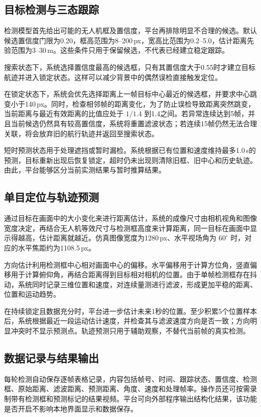 \subsection{目标检测与三态跟踪}

检测模型首先给出可能的无人机框及置信度，平台再排除明显不合理的候选。默认候选置信度门限为0.20，框高范围为8--200\,px，宽高比范围为0.2--5.0，估计距离先验范围为3--30\,m。这些条件只用于保留候选，不代表已经建立稳定跟踪。

搜索状态下，系统选择置信度最高的候选框，只有其置信度大于0.55时才建立目标航迹并进入锁定状态。这样可以减少背景中的偶然误检直接触发定位。

在锁定状态下，系统会优先选择距离上一帧目标中心最近的候选框，并要求中心跳变小于140\,px。同时，检查相邻帧的距离变化，为了防止误检导致距离突然跳变，当前距离与最近有效距离的比值应处于 $1/1.4$ 到1.4之间。若异常连续达到5帧，并且当前候选仍然具有较高置信度，系统将重置滤波状态；若连续15帧仍然无法合理关联，将会放弃旧的航行轨迹并返回至搜索状态。

短时预测状态用于处理遮挡或暂时漏检。系统根据已有位置和速度维持最多1.0\,s的预测，目标重新出现后恢复锁定，超时仍未出现则清除旧框、旧中心和历史轨迹。由此，平台能够区分当前实测结果与暂时推算结果。

\subsection{单目定位与轨迹预测}

通过目标在画面中的大小变化来进行距离估计，系统的成像尺寸由相机视角和图像宽度决定，再结合无人机等效尺寸与检测框高度来计算距离，同一目标在画面中显示得越高，估计距离就越近。仿真图像宽度为1280\,px、水平视场角为 $60^{\circ}$ 时，对应的水平焦距约为1108.5\,px。

方向估计利用检测框中心相对画面中心的偏移。水平偏移用于计算方位角，竖直偏移用于计算俯仰角，再结合距离得到目标相对相机的位置。由于单帧检测框存在抖动，系统同时记录三维位置和速度，对连续量测进行滤波，形成更加平稳的距离、位置和运动趋势。

在持续锁定且数据充分时，平台进一步估计未来1秒的位置。至少积累5个位置样本后，系统根据最近一段运动估计速度，并检查其与滤波速度方向是否一致；方向明显冲突时不显示预测点。轨迹预测只用于辅助观察，不替代当前帧的真实检测。

\subsection{数据记录与结果输出}

每轮检测自动保存逐帧表格记录，内容包括帧号、时间、跟踪状态、置信度、检测框、原始距离、滤波距离、预测距离、角度、速度和处理帧率。操作员还可按需录制带有检测框和预测标记的结果视频。平台可向外部程序输出结构化结果，该功能是否开启不影响本地界面显示和数据保存。


